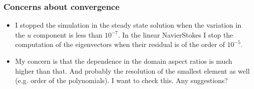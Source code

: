 \documentclass[
	aspectratio=169, %
	t, %
	onlytextwidth, %
	10pt, %
]{beamer}
\begin{document}
\begin{frame}
	\frametitle{Concerns about convergence}

	\begin{itemize}
		\item I stopped the simulation in the steady state solution when the variation in the $u$ component is less than $10^{-7}$. In the linear NavierStokes I stop the computation of the eigenvectors when their residual is of the order of $10^{-5}$.
		\item My concern is that the dependence in the domain aspect ratios is much higher than that. And probably the resolution of the smallest element as well (e.g. order of the polynomials). I want to check this. Any suggestions?
	\end{itemize}
\end{frame}
\end{document}
